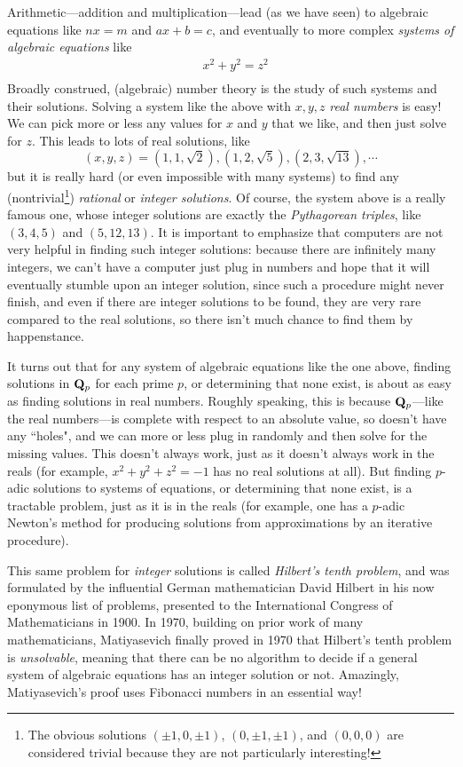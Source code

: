 \documentclass[11pt,oneside]{amsart}
\begin{document}
Arithmetic---addition and multiplication---lead (as we have seen) to 
algebraic equations like $nx=m$ and $ax+b=c$, and eventually to more complex {\em systems of algebraic equations}
like
\begin{align*}
	&x^2 + y^2 = z^2\\
\end{align*}
Broadly construed, (algebraic) number theory is the study of such systems and their solutions.  
Solving a system like the above with $x,y,z$ {\em real numbers} is easy!  We can pick more or less
any values for $x$ and $y$ that we like, and then just solve for $z$.  This leads to lots of real solutions, like
$$
(x,y,z) = (1,1,\sqrt{2}), (1,2,\sqrt{5}), (2,3,\sqrt{13}),\cdots
$$
but it is really hard (or even impossible with many systems) to find any (nontrivial\footnote{The obvious solutions 
$(\pm1,0,\pm1)$, $(0,\pm 1, \pm 1)$, and $(0,0,0)$ are considered trivial because they are not particularly interesting!
}) {\em rational} or {\em integer solutions}.
Of course, the system above is a really famous one, whose integer solutions are exactly the {\em Pythagorean triples},
like $(3,4,5)$ and $(5,12,13)$.  It is important to emphasize that computers are not very helpful in finding such integer solutions:
because there are infinitely many integers, we can't have a computer just plug in numbers and hope that it will eventually stumble upon an integer solution,
since such a procedure might never finish, and even if there are integer solutions to be found, they are very rare compared to the real solutions,
so there isn't much chance to find them by happenstance.  

It turns out that for any system of algebraic equations like the one above, 
finding solutions in $\mathbf{Q}_p$ for each prime $p$, or determining that none exist, 
is about as easy as finding solutions in real numbers.  Roughly speaking, this is because $\mathbf{Q}_p$---like the real numbers---is complete
with respect to an absolute value, so doesn't have any ``holes", and we can more or less plug in randomly and then solve for the missing values.
This doesn't always work, just as it doesn't always work in the reals (for example, $x^2+y^2+z^2 = -1$ has no real solutions at all).
But finding $p$-adic solutions to systems of equations, or determining that none exist, is a tractable problem,
just as it is in the reals (for example, one has a $p$-adic Newton's method for producing solutions from approximations by an iterative procedure).

This same problem for {\em integer} solutions is called {\em Hilbert's tenth problem}, and was formulated by the influential 
German mathematician David Hilbert in his now eponymous list of problems, presented to the International Congress of Mathematicians in 1900.
In 1970, building on prior work of many mathematicians, Matiyasevich finally proved in 1970 that Hilbert's tenth problem is {\em unsolvable},
meaning that there can be no algorithm to decide if a general system of algebraic equations has an integer solution or not.
Amazingly, Matiyasevich's proof uses Fibonacci numbers in an essential way!
\end{document}
